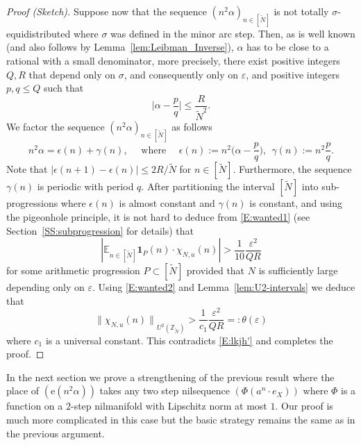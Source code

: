 \documentclass[11pt]{amsart}
\theoremstyle{definition}
\begin{document}
\begin{proof}[Proof (Sketch)]
  Suppose now that the sequence
$(n^2\alpha)_{n\in [{{\widetilde N}}]}$ is not totally $\sigma$-equidistributed
where  $\sigma$ was defined in the minor arc step. Then, as is well
known (and also follows by Lemma~\ref{lem:Leibman_Inverse}),
$\alpha$ has to be close to a rational with a small denominator,
more precisely, there exist positive integers $Q,R$ that depend only
on $\sigma$, and consequently only on ${\varepsilon}$, and positive integers
$p,q\leq Q$ such that
$$
\Big|\alpha-\frac{p}{q}\Big|\leq \frac{R}{{{\widetilde N}}^2}.
$$
We factor the sequence  $(n^2\alpha)_{n\in [{{\widetilde N}}]}$ as follows
$$
n^2\alpha=\epsilon(n)+\gamma(n), \quad \text{ where }  \quad \epsilon(n):=n^2\Big(\alpha-\frac{p}{q}\Big), \ \ \gamma(n):=n^2\frac{p}{q}.
$$
Note that $|\epsilon(n+1)-\epsilon(n)|\leq 2R/{{\widetilde N}}$ for $n\in [{{\widetilde N}}]$.
Furthermore,  the sequence $\gamma(n)$ is periodic with period $q$. After
partitioning the interval $[{{\widetilde N}}]$ into sub-progressions where
 $\epsilon(n)$ is almost constant and $\gamma(n)$ is constant, and using the pigeonhole principle,
  it is not hard to deduce
from \eqref{E:wanted1} (see
Section~\ref{SS:subprogression} for details) that
\begin{equation}\label{E:wanted2}
|{{\mathbb E}}_{n\in [{{\widetilde N}}]}{\mathbf{1}}_P(n)\cdot \chi_{N,u}(n)|>
\frac{1}{10}\frac{{\varepsilon}^2}{QR}
\end{equation}
for some arithmetic progression $P\subset[{{\widetilde N}}]$ provided that $N$ is
sufficiently large depending only on ${\varepsilon}$. Using \eqref{E:wanted2}
and Lemma~\ref{lem:U2-intervals} we deduce that
\begin{equation}\label{E:lkjh}
{\lVert {\chi_{N,u}(n)} \rVert}_{U^2({{\mathbb Z}}_{{\widetilde N}})}> \frac{1}{c_1} \frac{{\varepsilon}^2}{QR}
=:\theta({\varepsilon})
\end{equation}
where $c_1$ is a universal constant. This contradicts \eqref{E:lkjh'}
and completes the
proof.
\end{proof}
In the next section we prove a strengthening of the previous result where
the place of
 $({\mathrm{e}}(n^2\alpha))$ takes
any two step nilsequence $(\Phi(a^n\cdot e_X))$ where $\Phi$ is a
function
 on a $2$-step nilmanifold with Lipschitz norm at most $1$. Our proof is much more
complicated in this case
but  the basic   strategy remains the same as in the previous
argument.
\end{document}
